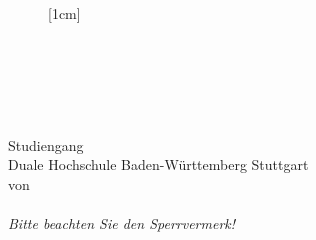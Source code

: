 \thispagestyle{plain}
\begin{titlepage}
\enlargethispage{4.0cm}
\sffamily 								%

\singlespacing
\begin{figure}
	\hspace{-2.0cm}
     \raisebox{0.4cm}[1cm]{}
    \hspace{7cm}
\end{figure} 


\begin{center}

\huge{\textsc{\textbf{\titel}}}\\[1.5ex]
\Large{\textbf{\untertitel}}\\[5ex]
\LARGE{\textbf{\arbeit}}\\[2ex]
\normalsize{\prufungvortext \\[1ex] \prufung}\\[3ex]
\Large{Studiengang \studiengang}\\[1ex]
\normalsize{Duale Hochschule Baden-Württemberg Stuttgart}\\[5ex]
von\\[1ex] \autor \\[2ex] \small{\textit{Bitte beachten Sie den Sperrvermerk!}} \\[14ex]


\end{center}
\end{titlepage}
